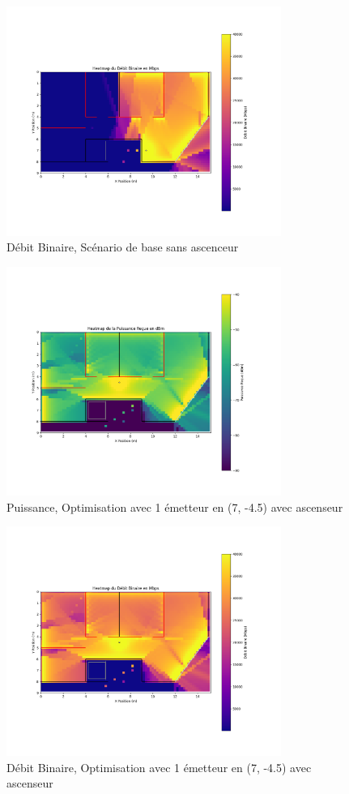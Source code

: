 \begin{figure}[H]
    \centering
    \includegraphics[width=0.8\textwidth]{Pictures/mbpssa.png}
    \caption{Débit Binaire, Scénario de base sans ascenceur}
    \label{mbpsbasesa}
\end{figure}
\begin{figure}[H]
    \centering
    \includegraphics[width=0.8\textwidth]{Pictures/opt1bpma.png}
    \caption{Puissance, Optimisation avec 1 émetteur en (7, -4.5) avec ascenseur }
    \label{opti1adbm}
\end{figure}
\begin{figure}[H]
    \centering
    \includegraphics[width=0.8\textwidth]{Pictures/opti1mbpsa.png}
    \caption{Débit Binaire, Optimisation avec 1 émetteur en (7, -4.5) avec ascenseur}
    \label{opti1ambps}
\end{figure}
